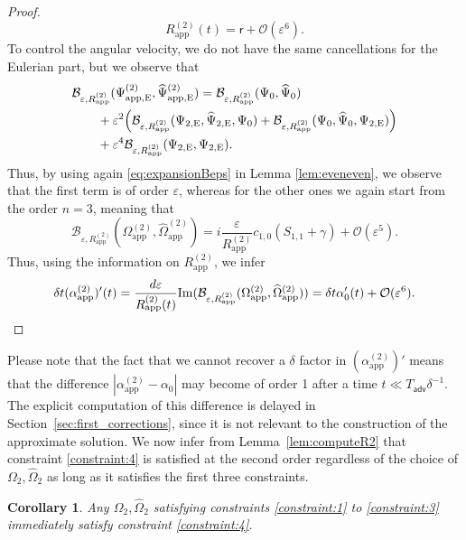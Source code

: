 \documentclass[11pt,reqno,a4paper]{amsart}
\def\eps{\varepsilon}
\def\Im{{\rm Im}}
\newcommand{\cB}{\mathcal{B}}
\newcommand{\cO}{\mathcal{O}}
\newcommand{\adv}{\mathsf{adv}}
\newcommand{\1}{\mathbbm{1}}
\newtheorem{corollary}[proposition]{Corollary}
\theoremstyle{definition}
\theoremstyle{definition}
\numberwithin{equation}{section}
\newcommand{\Mapp}[2]{#1^{(#2)}_\mathrm{app}}
\newcommand{\Mappp}[3]{#1^{(#2)}_\mathrm{app,#3}}
\begin{document}
\begin{proof}
\begin{equation}
    \Mapp{R}{2}(t) = \mathsf{r} + \cO(\eps^6).
\end{equation}
To control the angular velocity, we do not have the same cancellations for the Eulerian part, but we observe that 
\begin{align}
    & \cB_{\eps,\Mapp{R}{2}}(\Mappp{\Psi}{2}{E},\Mappp{\widehat{\Psi}}{2}{E})=\cB_{\eps,\Mapp{R}{2}}(\Psi_0,\widehat{\Psi}_0) \\
     &\qquad + \eps^2\Big( \cB_{\eps,\Mapp{R}{2}}(\Psi_{2,\mathrm{E}},\widehat{\Psi}_{2,\mathrm{E}},\Psi_0) + \cB_{\eps,\Mapp{R}{2}}(\Psi_0,\widehat{\Psi}_0,\Psi_{2,\mathrm{E}})\Big)  \\
    &\qquad + \eps^4\cB_{\eps,\Mapp{R}{2}}(\Psi_{2,{\rm E}},\Psi_{2,{\rm E}}).
\end{align}
Thus, by using again \cref{eq:expansionBeps} in Lemma \ref{lem:eveneven}, we observe that the first term is of order $\eps$, whereas for the other ones  we again start from the order $n=3$, meaning that 
\begin{equation}
    \cB_{\eps,\Mapp{R}{2}}(\Mapp{\Omega}{2},\Mapp{\widehat{\Omega}}{2}) = i \frac{\eps}{\Mapp{R}{2}} c_{1,0} (S_{1,1}+\gamma) + \cO(\eps^5).
\end{equation}
Thus, using the information on $\Mapp{R}{2}$, we infer 
\begin{equation}
    \delta t (\Mapp{\alpha}{2})'(t) = \frac{d \eps}{\Mapp{R}{2}(t)} \Im(\cB_{\eps,\Mapp{R}{2}}(\Mapp{\Omega}{2},\Mapp{\widehat{\Omega}}{2})) = \delta t \alpha_0'(t) + \cO(\eps^6).
\end{equation}
\end{proof}
Please note that the fact that we cannot recover a $\delta$ factor in $(\Mapp{\alpha}{2})'$ means that the difference $|\Mapp{\alpha}{2} - \alpha_0|$ may become of order 1 after a time $t \ll T_\adv \delta^{-1}$. The explicit computation of this difference is delayed in Section~\ref{sec:first_corrections}, since it is not relevant to the construction of the approximate solution. We now infer from Lemma~\ref{lem:computeR2} that constraint \ref{constraint:4} is satisfied at the second order regardless of the choice of $\Omega_2,\widehat{\Omega}_2$ as long as it satisfies the first three constraints.
\begin{corollary}
    Any $\Omega_2,\widehat{\Omega}_2$ satisfying constraints \ref{constraint:1} to \ref{constraint:3} immediately satisfy constraint \ref{constraint:4}.
\end{corollary}
\end{document}
